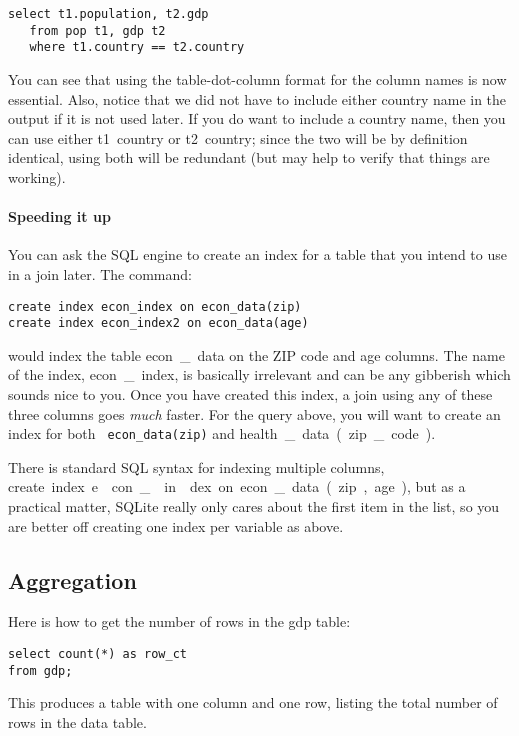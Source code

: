 \begin{lstlisting}
select t1.population, t2.gdp
   from pop t1, gdp t2
   where t1.country == t2.country
\end{lstlisting}

You can see that using the table-dot-column format for the column names is now
essential. Also, notice that we did not have to include either \si{country} name
in the output if it is not used later. If you do want to include a
country name,
then you can use either \si{t1.country} or \si{t2.country}; since
the two will be by definition identical, using both will be redundant
(but may help to verify that things are working).


\paragraph{Speeding it up}
You can ask the SQL engine to create an index for a table that you
intend to use in a join later. The command:
\begin{lstlisting}
create index econ_index on econ_data(zip)
create index econ_index2 on econ_data(age)
\end{lstlisting}
would index the table \si{econ\_data} on the ZIP code and age columns.
The name of the index, \si{econ\_index}, is basically irrelevant and can
be any gibberish which sounds nice to you. Once you have created this
index, a join using any of these three columns goes {\sl much} faster.
For the query above, you will want to create an index for both {\tt
econ\_data(zip)} and \si{health\_data(zip\_code)}.

There is standard SQL syntax for indexing multiple columns, 
\si{create index e\-con\_\-in\-dex on econ\_data(zip, age)}, but as a
practical matter, SQLite really only cares about the first item in the
list, so you are better off creating one index per variable as above.

\subsection{Aggregation}
Here is how to get the number of rows in the \si{gdp} table:
\begin{lstlisting}
select count(*) as row_ct 
from gdp;
\end{lstlisting}

This produces a table with one column and one row, listing the total
number of rows in the \si{data} table.

